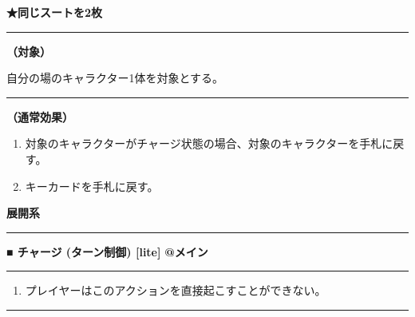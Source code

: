 \documentclass[twocolumn,a5paper,papersize,10pt]{jarticle}
\begin{document}
{\footnotesize\bf ★同じスートを2枚}

\vspace{1mm}%
\hrule height 0.1mm depth 0mm width 66.5mm %
\vspace{1mm}%
{\bf（対象）}

自分の場のキャラクター1体を対象とする。
\vspace{1mm}%
\hrule height 0.1mm depth 0mm width 66.5mm %
\vspace{1mm}%

{\bf（通常効果）}


\vspace{-1zh}%
\begin{enumerate}
\setlength{\leftskip}{-0.3cm}
\setlength{\parskip}{0pt} %

\item 対象のキャラクターがチャージ状態の場合、対象のキャラクターを手札に戻す。

\item キーカードを手札に戻す。
\vspace{-1zh}%
\end{enumerate}


\begin{tcolorbox}
{\scriptsize\bf 展開系}
\end{tcolorbox}
\vspace{-1zh}%
\vspace{2mm} %
\hrule height 0.5mm depth 0mm width 66.5mm %
\vspace{1mm} %
{\small\bf ■ チャージ {\scriptsize (ターン制御) [lite]}} %
\hfill 
{\footnotesize\bf @メイン }


\vspace{1mm}%
\hrule height 0.1mm depth 0mm width 66.5mm %
\vspace{1mm}%


\vspace{-1zh}%
\begin{enumerate}
\renewcommand{\labelenumi}{※}
\setlength{\leftskip}{-0.3cm}
\setlength{\itemsep}{0pt} %
\setlength{\parskip}{0pt} %

\item プレイヤーはこのアクションを直接起こすことができない。

\vspace{-3mm}%
\end{enumerate}
\vspace{1mm}%
\hrule height 0.1mm depth 0mm width 66.5mm %
\vspace{1mm}%
\end{document}
